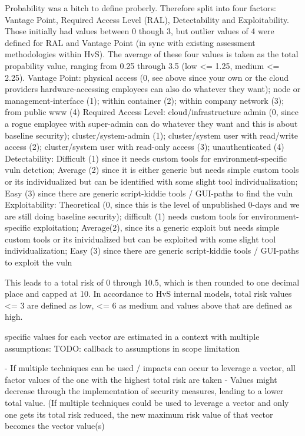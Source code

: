 Probability was a bitch to define proberly. Therefore split into four factors: Vantage Point, Required Access Level (RAL), Detectability and Exploitability. Those initially had values between 0 though 3, but outlier values of 4  were defined for RAL and Vantage Point (in sync with existing assessment methodologies within HvS).
The average of these four values is taken as the total propability value, ranging from 0.25 through 3.5 (low <= 1.25, medium <= 2.25).
Vantage Point: physical access (0, see above since your own or the cloud providers hardware-accessing employees can also do whatever they want); node or management-interface (1); within container (2); within company network (3); from public www (4)
Required Access Level: cloud/infrastructure admin (0, since a rogue employee with super-admin can do whatever they want and this is about baseline security); cluster/system-admin (1); cluster/system user with read/write access (2); cluster/system user with read-only access (3); unauthenticated (4)
Detectability: Difficult (1) since it needs custom tools for environment-specific vuln detction; Average (2) since it is either generic but needs simple custom tools or its individualized but can be identified with some slight tool individualization; Easy (3) since there are generic script-kiddie tools / GUI-paths to find the vuln
Exploitability: Theoretical (0, since this is the level of unpublished 0-days and we are still doing baseline security); difficult (1) needs custom tools for environment-specific exploitation; Average(2), since its a generic exploit but needs simple custom tools or its inividualized but can be exploited with some slight tool individualization; Easy (3) since there are generic script-kiddie tools / GUI-paths to exploit the vuln

This leads to a total risk of 0 through 10.5, which is then rounded to one decimal place and capped at 10. In accordance to HvS internal models, total risk values <= 3 are defined as low, <= 6 as medium and values above that are defined as high.

specific values for each vector are estimated in a context with multiple assumptions:
TODO: callback to assumptions in scope limitation

- If multiple techniques can be used / impacts can occur to leverage a vector, all factor values of the one with the highest total risk are taken
- Values might decrease through the implementation of security measures, leading to a lower total value. (If multiple techniques could be used to leverage a vector and only one gets its total risk reduced, the new maximum risk value of that vector becomes the vector value(s)

